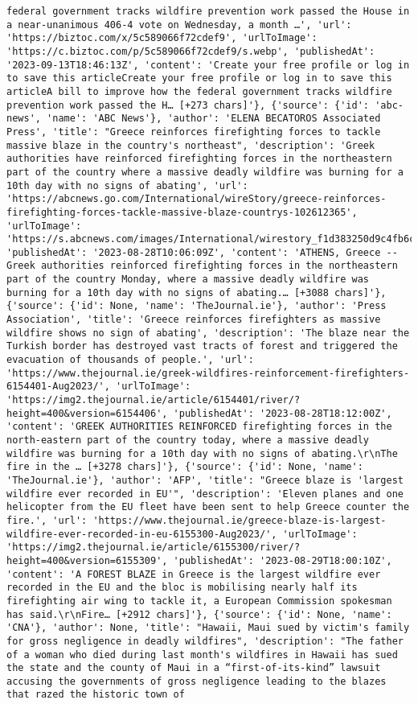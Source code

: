 \documentclass[
  letterpaper,
  DIV=11,
  numbers=noendperiod]{scrartcl}
\begin{document}
\begin{verbatim}
federal government tracks wildfire prevention work passed the House in a near-unanimous 406-4 vote on Wednesday, a month …', 'url': 'https://biztoc.com/x/5c589066f72cdef9', 'urlToImage': 'https://c.biztoc.com/p/5c589066f72cdef9/s.webp', 'publishedAt': '2023-09-13T18:46:13Z', 'content': 'Create your free profile or log in to save this articleCreate your free profile or log in to save this articleA bill to improve how the federal government tracks wildfire prevention work passed the H… [+273 chars]'}, {'source': {'id': 'abc-news', 'name': 'ABC News'}, 'author': 'ELENA BECATOROS Associated Press', 'title': "Greece reinforces firefighting forces to tackle massive blaze in the country's northeast", 'description': 'Greek authorities have reinforced firefighting forces in the northeastern part of the country where a massive deadly wildfire was burning for a 10th day with no signs of abating', 'url': 'https://abcnews.go.com/International/wireStory/greece-reinforces-firefighting-forces-tackle-massive-blaze-countrys-102612365', 'urlToImage': 'https://s.abcnews.com/images/International/wirestory_f1d383250d9c4fb6c0f66165643914fe_16x9_992.jpg', 'publishedAt': '2023-08-28T10:06:09Z', 'content': 'ATHENS, Greece -- Greek authorities reinforced firefighting forces in the northeastern part of the country Monday, where a massive deadly wildfire was burning for a 10th day with no signs of abating.… [+3088 chars]'}, {'source': {'id': None, 'name': 'TheJournal.ie'}, 'author': 'Press Association', 'title': 'Greece reinforces firefighters as massive wildfire shows no sign of abating', 'description': 'The blaze near the Turkish border has destroyed vast tracts of forest and triggered the evacuation of thousands of people.', 'url': 'https://www.thejournal.ie/greek-wildfires-reinforcement-firefighters-6154401-Aug2023/', 'urlToImage': 'https://img2.thejournal.ie/article/6154401/river/?height=400&version=6154406', 'publishedAt': '2023-08-28T18:12:00Z', 'content': 'GREEK AUTHORITIES REINFORCED firefighting forces in the north-eastern part of the country today, where a massive deadly wildfire was burning for a 10th day with no signs of abating.\r\nThe fire in the … [+3278 chars]'}, {'source': {'id': None, 'name': 'TheJournal.ie'}, 'author': 'AFP', 'title': "Greece blaze is 'largest wildfire ever recorded in EU'", 'description': 'Eleven planes and one helicopter from the EU fleet have been sent to help Greece counter the fire.', 'url': 'https://www.thejournal.ie/greece-blaze-is-largest-wildfire-ever-recorded-in-eu-6155300-Aug2023/', 'urlToImage': 'https://img2.thejournal.ie/article/6155300/river/?height=400&version=6155309', 'publishedAt': '2023-08-29T18:00:10Z', 'content': 'A FOREST BLAZE in Greece is the largest wildfire ever recorded in the EU and the bloc is mobilising nearly half its firefighting air wing to tackle it, a European Commission spokesman has said.\r\nFire… [+2912 chars]'}, {'source': {'id': None, 'name': 'CNA'}, 'author': None, 'title': "Hawaii, Maui sued by victim's family for gross negligence in deadly wildfires", 'description': "The father of a woman who died during last month's wildfires in Hawaii has sued the state and the county of Maui in a “first-of-its-kind” lawsuit accusing the governments of gross negligence leading to the blazes that razed the historic town of 
\end{verbatim}
\end{document}
